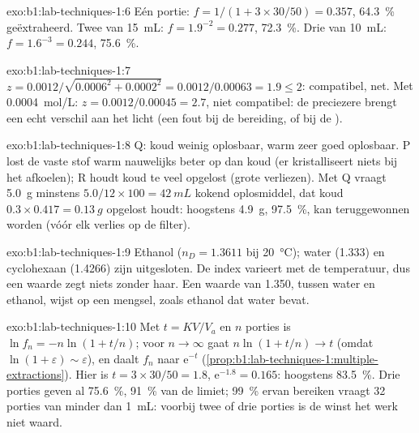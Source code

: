 \begin{solution}{exo:b1:lab-techniques-1:6}
Eén portie: $f = 1/(1 + 3 \times 30/50) = 0.357$, \qty{64.3}{\percent}
geëxtraheerd. Twee van \qty{15}{mL}: $f = 1.9^{-2} = 0.277$,
\qty{72.3}{\percent}. Drie van \qty{10}{mL}: $f = 1.6^{-3} = 0.244$,
\qty{75.6}{\percent}.
\end{solution}

\begin{solution}{exo:b1:lab-techniques-1:7}
$z = 0.0012/\sqrt{0.0006^2 + 0.0002^2} = 0.0012/0.00063 = 1.9 \le 2$:
compatibel, net. Met \qty{0.0004}{mol/L}: $z = 0.0012/0.00045 = 2.7$,
niet compatibel: de preciezere  brengt een echt verschil aan het
licht (een fout bij de bereiding, of bij de ).
\end{solution}

\begin{solution}{exo:b1:lab-techniques-1:8}
Q: koud weinig oplosbaar, warm zeer goed oplosbaar. P lost de vaste stof
warm nauwelijks beter op dan koud (er kristalliseert niets bij het
afkoelen); R houdt koud te veel opgelost (grote verliezen). Met Q vraagt
\qty{5.0}{g} minstens $5.0/12 \times 100 = \qty{42}{mL}$ kokend
oplosmiddel, dat koud $0.3 \times 0.417 = \qty{0.13}{g}$ opgelost houdt:
hoogstens \qty{4.9}{g}, \qty{97.5}{\percent}, kan teruggewonnen worden
(vóór elk verlies op de filter).
\end{solution}

\begin{solution}{exo:b1:lab-techniques-1:9}
Ethanol ($n_D = 1.3611$ bij \qty{20}{\celsius}); water (1.333) en
cyclohexaan (1.4266) zijn uitgesloten. De index varieert met de
temperatuur, dus een waarde zegt niets zonder haar. Een waarde van 1.350,
tussen water en ethanol, wijst op een mengsel, zoals ethanol dat water
bevat.
\end{solution}

\begin{solution}{exo:b1:lab-techniques-1:10}
Met $t = KV/V_a$ en $n$ porties is $\ln f_n = -n\ln(1 + t/n)$; voor
$n \to \infty$ gaat $n \ln(1 + t/n) \to t$ (omdat $\ln(1 + \varepsilon) \sim
\varepsilon$), en daalt $f_n$ naar $\mathrm{e}^{-t}$ (\cref{prop:b1:lab-techniques-1:multiple-extractions}).
Hier is $t = 3 \times 30/50 = 1.8$, $\mathrm{e}^{-1.8} = 0.165$: hoogstens
\qty{83.5}{\percent}. Drie porties geven al \qty{75.6}{\percent},
\qty{91}{\percent} van de limiet; \qty{99}{\percent} ervan bereiken vraagt
32 porties van minder dan \qty{1}{mL}: voorbij twee of drie porties is de
winst het werk niet waard.
\end{solution}

